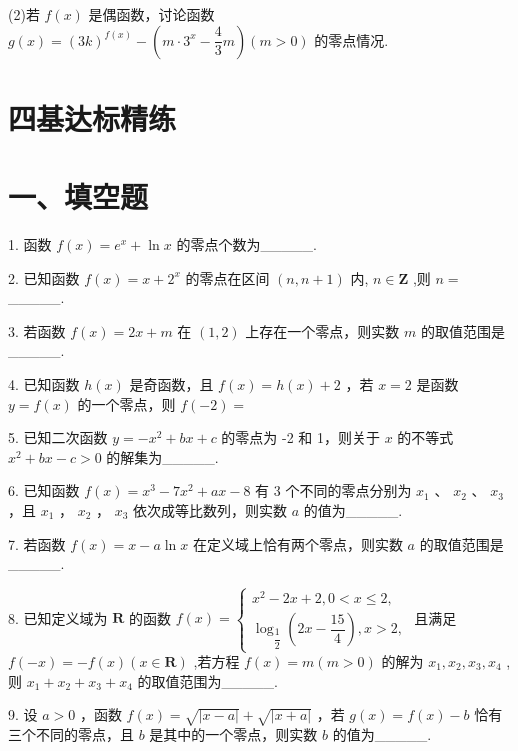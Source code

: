 (2)若 $f\left( x\right)$ 是偶函数，讨论函数 $g\left( x\right)  = {\left( 3k\right) }^{f\left( x\right) } - \left( {m \cdot  {3}^{x} - \dfrac{4}{3}m}\right) \left( {m > 0}\right)$ 的零点情况.

\section*{四基达标精练}

\section*{一、填空题}

1. 函数 $f\left( x\right)  = {{e}}^{x} + \ln x$ 的零点个数为\_\_\_\_\_.

2. 已知函数 $f\left( x\right)  = x + {2}^{x}$ 的零点在区间 $\left( {n,n + 1}\right)$ 内, $n \in  \mathbf{Z}$ ,则 $n =$ \_\_\_\_\_.

3. 若函数 $f\left( x\right)  = {2x} + m$ 在 $\left( {1,2}\right)$ 上存在一个零点，则实数 $m$ 的取值范围是\_\_\_\_\_.

4. 已知函数 $h\left( x\right)$ 是奇函数，且 $f\left( x\right)  = h\left( x\right)  + 2$ ，若 $x = 2$ 是函数 $y = f\left( x\right)$ 的一个零点，则 $f\left( {-2}\right)  =$

5. 已知二次函数 $y =  - {x}^{2} + {bx} + c$ 的零点为 -2 和 1，则关于 $x$ 的不等式 ${x}^{2} + {bx} - c > 0$ 的解集为\_\_\_\_\_.

6. 已知函数 $f\left( x\right)  = {x}^{3} - 7{x}^{2} + {ax} - 8$ 有 3 个不同的零点分别为 ${x}_{1}$ 、 ${x}_{2}$ 、 ${x}_{3}$ ，且 ${x}_{1}$ ， ${x}_{2}$ ， ${x}_{3}$ 依次成等比数列，则实数 $a$ 的值为\_\_\_\_\_.

7. 若函数 $f\left( x\right)  = x - a\ln x$ 在定义域上恰有两个零点，则实数 $a$ 的取值范围是\_\_\_\_\_.

8. 已知定义域为 $\mathbf{R}$ 的函数 $f\left( x\right)  = \left\{  \begin{array}{l} {x}^{2} - {2x} + 2,0 < x \leq  2, \\  {\log }_{\dfrac{1}{2}}\left( {{2x} - \dfrac{15}{4}}\right) ,x > 2, \end{array}\right.$ 且满足 $f\left( {-x}\right)  =  - f\left( x\right) \left( {x \in  \mathbf{R}}\right)$ ,若方程 $f\left( x\right)  = m\left( {m > 0}\right)$ 的解为 ${x}_{1},{x}_{2},{x}_{3},{x}_{4}$ ,则 ${x}_{1} + {x}_{2} + {x}_{3} + {x}_{4}$ 的取值范围为\_\_\_\_\_.

9. 设 $a > 0$ ，函数 $f\left( x\right)  = \sqrt{\left| x - a\right| } + \sqrt{\left| x + a\right| }$ ，若 $g\left( x\right)  = f\left( x\right)  - b$ 恰有三个不同的零点，且 $b$ 是其中的一个零点，则实数 $b$ 的值为\_\_\_\_\_.

